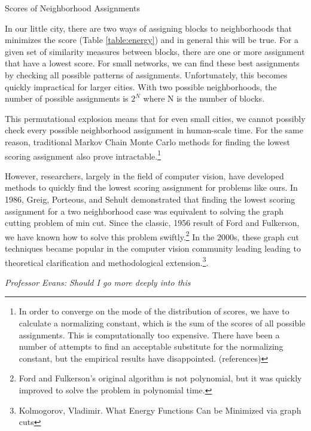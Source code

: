 \begin{table}[h]

\caption{Scores of Neighborhood Assignments}
\label{table:energy}
\end{table}

In our little city, there are two ways of assigning blocks to
neighborhoods that minimizes the score (Table \ref{table:energy}) and
in general this will be true. For a given set of similarity measures
between blocks, there are one or more assignment that have a lowest
score. For small networks, we can find these best assignments by
checking all possible patterns of assignments. Unfortunately, this
becomes quickly impractical for larger cities. With two possible
neighborhoods, the number of possible assignments is $2^N$ where N is
the number of blocks.

This permutational explosion means that for even small cities, we
cannot possibly check every possible neighborhood assignment in
human-scale time. For the same reason, traditional Markov Chain Monte
Carlo methods for finding the lowest scoring assignment also prove
intractable.\footnote{In order to converge on the mode of the
  distribution of scores, we have to calculate a normalizing constant,
  which is the sum of the scores of all possible assignments. This is
  computationally too expensive. There have been a number of attempts
  to find an acceptable substitute for the normalizing constant, but
  the empirical results have disappointed. (references)}

However, researchers, largely in the field of computer vision, have
developed methods to quickly find the lowest scoring assignment for
problems like ours. In 1986, Greig, Porteous, and Sehult demonstrated
that finding the lowest scoring assignment for a two neighborhood case
was equivalent to solving the graph cutting problem of min cut. Since
the classic, 1956 result of Ford and Fulkerson, we have known how to
solve this problem swiftly.\footnote{Ford and Fulkerson's original
  algorithm is not polynomial, but it was quickly improved to solve
  the problem in polynomial time.} In the 2000s, these graph cut
techniques became popular in the computer vision community leading
leading to theoretical clarification and methodological
extension.\footnote{Kolmogorov, Vladimir. What Energy Functions Can be
  Minimized via graph cuts}.

\emph{Professor Evans: Should I go more deeply into this}

